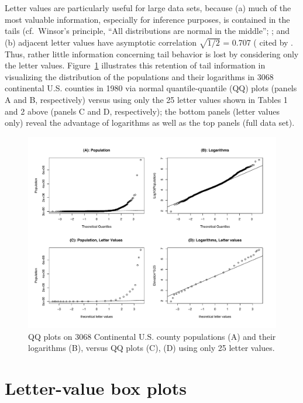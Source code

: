 \documentclass[oneside]{article}
\begin{document}
Letter values are particularly useful for large data sets, because (a) much of the most valuable information, especially for inference purposes, is contained in the tails (cf.\ Winsor's principle, ``All distributions are normal in the middle''; \citep[pg. 457]{tukey60}; and (b) adjacent letter values have asymptotic correlation $\sqrt{1/2}$ = 0.707 (\citep{mosteller46} cited by \citet[pg. 51--52]{dchlv}. Thus, rather little information concerning tail behavior is lost by considering only the letter values. Figure~\ref{qqpop4} illustrates this retention of tail information in visualizing the distribution of the populations and their logarithms in 3068 continental U.S. counties in 1980 via normal quantile-quantile (QQ) plots (panels A and B, respectively) versus using only the 25 letter values shown in Tables 1 and 2 above (panels C and D, respectively); the bottom panels (letter values only) reveal the advantage of logarithms as well as the top panels (full data set).

\begin{figure}[hbtp]
  \centering
  \includegraphics[width = 0.75 \linewidth]{qqpop4}

  \caption{QQ plots on 3068 Continental U.S. county populations (A) and their
  logarithms (B), versus QQ plots (C), (D) using only 25 letter values.}
  \label{qqpop4}
\end{figure}

\section{Letter-value box plots}
\label{sec:lv-boxplots}
\end{document}
